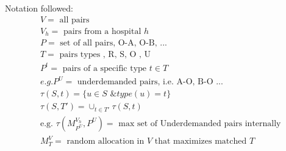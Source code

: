 \documentclass[12pt]{article}
\begin{document}
Notation followed: 
\begin{align} 
& V = \text{ all pairs } \\
& V_h = \text{ pairs from a hospital } h \\
& P = \text{ set of all pairs, O-A, O-B, ... } \\
& T = \text { pairs types , R, S, O , U } \\
& P^t = \text{ pairs of a specific type } t \in T \\
& e.g. P^U = \text{ underdemanded pairs, i.e. A-O, B-O ...}\\
& \tau(S, t) = \{  u \in S \text{ \& }  type(u) =t \} \\
& \tau(S, T') = \cup_{t \in T'} \tau(S, t) \\ 
& \text{e.g. } \tau (M_{P^U}^{V_h}, P^U) = \text{ max set of Underdemanded pairs internally } \\
& M_T^V = \text { random allocation in $V$ that maximizes matched $T$ }
\end{align}
\end{document}
